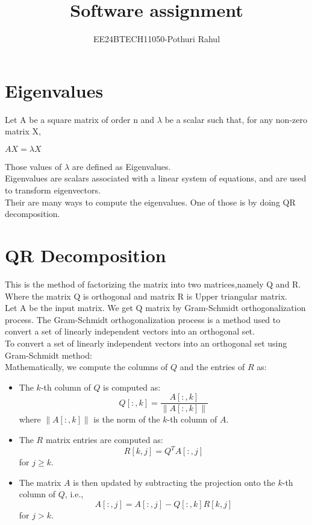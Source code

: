 \documentclass[12pt]{article}
\title{Software assignment}
\author{EE24BTECH11050-Pothuri Rahul}
\date{ }
\begin{document}
\maketitle
\section{Eigenvalues}
 Let A be a square matrix of order n and $\lambda$ be a scalar such that, for any non-zero matrix X,
\begin{center}
$AX = \lambda X$
\end{center}
Those values of $\lambda$ are defined as Eigenvalues.\\
Eigenvalues are scalars associated with a linear system of equations, and are used to transform eigenvectors.
\\
Their are many ways to compute the eigenvalues. One of those is by doing QR decomposition. \\
\section{QR Decomposition}
This is the method of factorizing the matrix into two matrices,namely Q and R. Where the matrix Q is orthogonal and matrix R is Upper triangular matrix. \\
Let A be the input matrix. We get Q matrix by Gram-Schmidt orthogonalization process. The Gram-Schmidt orthogonalization process is a method used to convert a set of linearly independent vectors into an orthogonal set. \\
To convert a set of linearly independent vectors into an orthogonal  set using Gram-Schmidt method: \\
Mathematically, we compute the columns of \(Q\) and the entries of \(R\) as:

\begin{itemize}
    \item The \(k\)-th column of \(Q\) is computed as:
    \[
    Q[:,k] = \frac{A[:,k]}{\|A[:,k]\|}
    \]
    where \(\|A[:,k]\|\) is the norm of the \(k\)-th column of \(A\).

    \item The \(R\) matrix entries are computed as:
    \[
    R[k,j] = Q^T A[:,j]
    \]
    for \(j \geq k\).

    \item The matrix \(A\) is then updated by subtracting the projection onto the \(k\)-th column of \(Q\), i.e.,
    \[
    A[:,j] = A[:,j] - Q[:,k] R[k,j]
    \]
    for \(j > k\).
\end{itemize}
\end{document}
